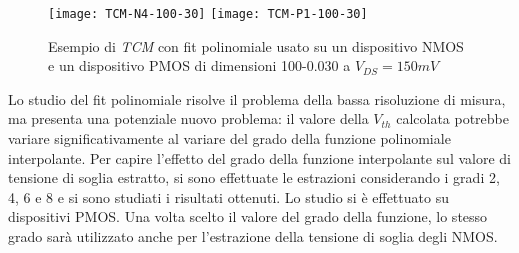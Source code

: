 \begin{figure}[H]
  \centering
  \texttt{[image: TCM-N4-100-30]}
  \texttt{[image: TCM-P1-100-30]}
  \caption{Esempio di \emph{TCM} con fit polinomiale usato su un dispositivo NMOS e un dispositivo PMOS di dimensioni 100-0.030 a $V_{DS} = 150 mV$}
\end{figure}

Lo studio del fit polinomiale risolve il problema della bassa risoluzione di misura, ma presenta una potenziale nuovo problema: il valore della $V_{th}$ calcolata potrebbe variare significativamente al variare del grado della funzione polinomiale interpolante. Per capire l'effetto del grado della funzione interpolante sul valore di tensione di soglia estratto, si sono effettuate le estrazioni considerando i gradi 2, 4, 6 e 8 e si sono studiati i risultati ottenuti. Lo studio si è effettuato su dispositivi PMOS. Una volta scelto il valore del grado della funzione, lo stesso grado sarà utilizzato anche per l'estrazione della tensione di soglia degli NMOS.

